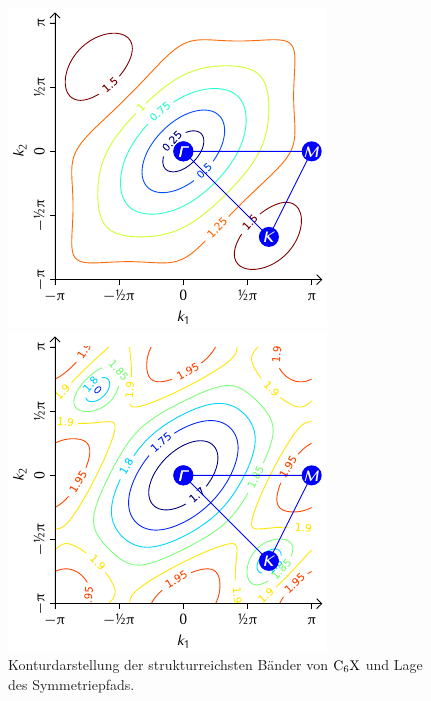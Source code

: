 \documentclass[a4paper, 10pt, twoside, openany]{book} %
\begin{document}
	\begin{figure}
		\begin{minipage}[t]{0.48\textwidth}
			\includegraphics[width=\textwidth]{Abbildungen/Bandstrukturen/BZ_C6X_4.pdf}
		\end{minipage}
		\hfill
		\begin{minipage}[t]{0.48\textwidth}
			\includegraphics[width=\textwidth]{Abbildungen/Bandstrukturen/BZ_C6X_5.pdf}
		\end{minipage}
		\caption[Konturdarstellung der Dispersionsrelation von $\rm C_6X$]{Konturdarstellung der strukturreichsten Bänder von $\rm C_6X$ und Lage des Symmetriepfads.}
		\label{C6X Kontur}
	\end{figure}
\end{document}
